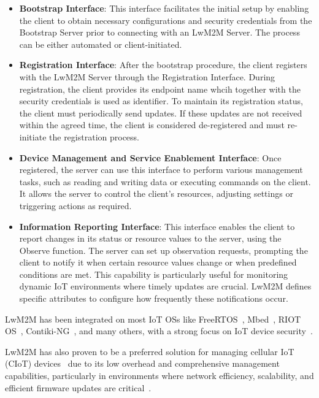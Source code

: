 \documentclass[11pt,sigconf]{iabart}
\begin{document}
\begin{itemize}
  \item \textbf{Bootstrap Interface}: This interface facilitates the initial setup by enabling the client to obtain necessary configurations and security credentials from the Bootstrap Server prior to connecting with an LwM2M Server. The process can be either automated or client-initiated.
  
  \item \textbf{Registration Interface}: After the bootstrap procedure, the client registers with the LwM2M Server through the Registration Interface. During registration, the client provides its endpoint name whcih together with the security credentials is used as identifier. To maintain its registration status, the client must periodically send updates. If these updates are not received within the agreed time, the client is considered de-registered and must re-initiate the registration process.
  
  \item \textbf{Device Management and Service Enablement Interface}: Once registered, the server can use this interface to perform various management tasks, such as reading and writing data or executing commands on the client. It allows the server to control the client's resources, adjusting settings or triggering actions as required.
  
  \item \textbf{Information Reporting Interface}: This interface enables the client to report changes in its status or resource values to the server, using the Observe function. The server can set up observation requests, prompting the client to notify it when certain resource values change or when predefined conditions are met. This capability is particularly useful for monitoring dynamic IoT environments where timely updates are crucial. LwM2M defines specific attributes to configure how frequently these notifications occur.
\end{itemize}

LwM2M has been integrated on most IoT OSs like FreeRTOS~\cite{freertos}, Mbed~\cite{mbed}, RIOT OS~\cite{riot_os}, Contiki-NG~\cite{contiki_ng}, and many others, with a strong focus on IoT device security~\cite{pop00010}.

LwM2M has also proven to be a preferred solution for managing cellular IoT (CIoT) devices~\cite{10333286} due to its low overhead and comprehensive management capabilities, particularly in environments where network efficiency, scalability, and efficient firmware updates are critical~\cite{8725488}.
\end{document}
